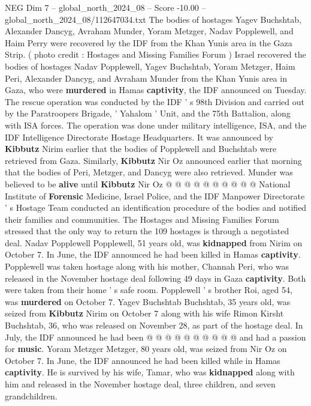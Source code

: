 \begin{textsample}{NEG Dim 7 – global\_north\_2024\_08 – Score -10.00 – global\_north\_2024\_08/112647034.txt}  \label{ex:f7_neg_081}
The bodies of hostages Yagev Buchshtab, Alexander Dancyg, Avraham Munder, Yoram Metzger, Nadav Popplewell, and Haim Perry were recovered by the IDF from the Khan Yunis area in the Gaza Strip. ( photo credit : Hostages and Missing Families Forum ) Israel recovered the bodies of hostages Nadav Popplewell, Yagev Buchshtab, Yoram Metzger, Haim Peri, Alexander Dancyg, and Avraham Munder from the Khan Yunis area in Gaza, who were \textbf{murdered} in Hamas \textbf{captivity}, the IDF announced on Tuesday.
The rescue operation was conducted by the IDF ' s 98th Division and carried out by the Paratroopers Brigade, ' Yahalom ' Unit, and the 75th Battalion, along with ISA forces.
The operation was done under military intelligence, ISA, and the IDF Intelligence Directorate Hostage Headquarters.
It was announced by \textbf{Kibbutz} Nirim earlier that the bodies of Popplewell and Buchshtab were retrieved from Gaza.
Similarly, \textbf{Kibbutz} Nir Oz announced earlier that morning that the bodies of Peri, Metzger, and Dancyg were also retrieved.
Munder was believed to be \textbf{alive} until \textbf{Kibbutz} Nir Oz @ @ @ @ @ @ @ @ @ @ National Institute of \textbf{Forensic} Medicine, Israel Police, and the IDF Manpower Directorate ' s Hostage Team conducted an identification procedure of the bodies and notified their families and communities.
The Hostages and Missing Families Forum stressed that the only way to return the 109 hostages is through a negotiated deal.
Nadav Popplewell Popplewell, 51 years old, was \textbf{kidnapped} from Nirim on October 7.
In June, the IDF announced he had been killed in Hamas \textbf{captivity}.
Popplewell was taken hostage along with his mother, Channah Peri, who was released in the November hostage deal following 49 days in Gaza \textbf{captivity}.
Both were taken from their home ' s safe room.
Popplewell ' s brother Roi, aged 54, was \textbf{murdered} on October 7.
Yagev Buchshtab Buchshtab, 35 years old, was seized from \textbf{Kibbutz} Nirim on October 7 along with his wife Rimon Kirsht Buchshtab, 36, who was released on November 28, as part of the hostage deal.
In July, the IDF announced he had been @ @ @ @ @ @ @ @ @ @ and had a passion for \textbf{music}.
Yoram Metzger Metzger, 80 years old, was seized from Nir Oz on October 7.
In June, the IDF announced he had been killed while in Hamas \textbf{captivity}.
He is survived by his wife, Tamar, who was \textbf{kidnapped} along with him and released in the November hostage deal, three children, and seven grandchildren.

\end{textsample}
